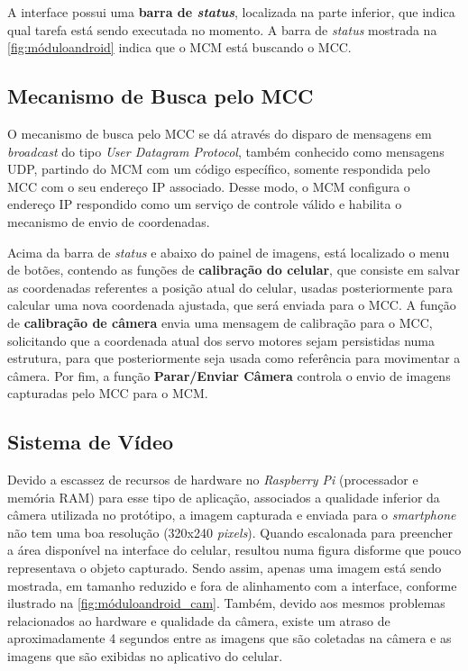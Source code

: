 A interface possui uma \textbf{barra de \textit{status}}, localizada na parte inferior, que indica qual tarefa está sendo executada no momento. A barra de \textit{status} mostrada na \autoref{fig:móduloandroid} indica que o MCM está buscando o MCC.\par

\subsection{Mecanismo de Busca pelo MCC}
\label{subsec:mecanismobuscamcc}

O mecanismo de busca pelo MCC se dá através do disparo de mensagens em \textit{broadcast} do tipo \textit{User Datagram Protocol}, também conhecido como mensagens UDP, partindo do MCM com um código específico, somente respondida pelo MCC com o seu endereço IP associado. Desse modo, o MCM configura o endereço IP respondido como um serviço de controle válido e habilita o mecanismo de envio de coordenadas.\par

Acima da barra de \textit{status} e abaixo do painel de imagens, está localizado o menu de botões, contendo as funções de \textbf{calibração do celular}, que consiste em salvar as coordenadas referentes a posição atual do celular, usadas posteriormente para calcular uma nova coordenada ajustada, que será enviada para o MCC. A função de \textbf{calibração de câmera} envia uma mensagem de calibração para o MCC, solicitando que a coordenada atual dos servo motores sejam persistidas numa estrutura, para que posteriormente seja usada como referência para movimentar a câmera. Por fim, a função \textbf{Parar/Enviar Câmera} controla o envio de imagens capturadas pelo MCC para o MCM.\par

\subsection{Sistema de Vídeo}
\label{subsec:sistemadevídeo}

Devido a escassez de recursos de hardware no \textit{Raspberry Pi} (processador e memória RAM) para esse tipo de aplicação, associados a qualidade inferior da câmera utilizada no protótipo, a imagem capturada e enviada para o \textit{smartphone} não tem uma boa resolução (320x240 \textit{pixels}). Quando escalonada para preencher a área disponível na interface do celular, resultou numa figura disforme que pouco representava o objeto capturado. Sendo assim, apenas uma imagem está sendo mostrada, em tamanho reduzido e fora de alinhamento com a interface, conforme ilustrado na \autoref{fig:móduloandroid_cam}. Também, devido aos mesmos problemas relacionados ao hardware e qualidade da câmera, existe um atraso de aproximadamente 4 segundos entre as imagens que são coletadas na câmera e as imagens que são exibidas no aplicativo do celular.

